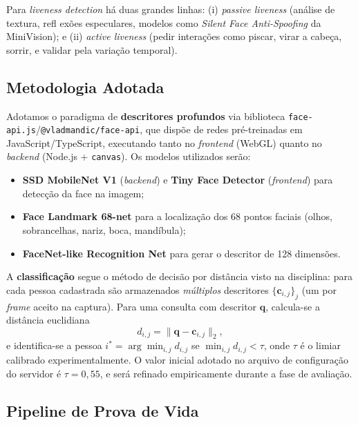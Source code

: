 \documentclass[12pt,a4paper]{article}
\begin{document}
Para \emph{liveness detection} h\'a duas grandes linhas: (i) \emph{passive liveness}
(an\'alise de textura, refl ex\~oes especulares, modelos como \emph{Silent Face
Anti-Spoofing} da MiniVision); e (ii) \emph{active liveness} (pedir intera\c{c}\~oes
como piscar, virar a cabe\c{c}a, sorrir, e validar pela varia\c{c}\~ao temporal).

\subsection{Metodologia Adotada}

Adotamos o paradigma de \textbf{descritores profundos} via biblioteca
\texttt{face-api.js}/\texttt{@vladmandic/face-api}, que disp\~oe de redes pr\'e-treinadas
em JavaScript/TypeScript, executando tanto no \emph{frontend} (WebGL) quanto no
\emph{backend} (Node.js + \texttt{canvas}). Os modelos utilizados ser\~ao:

\begin{itemize}[leftmargin=*]
    \item \textbf{SSD MobileNet V1} (\emph{backend}) e \textbf{Tiny Face Detector}
    (\emph{frontend}) para detec\c{c}\~ao da face na imagem;

    \item \textbf{Face Landmark 68-net} para a localiza\c{c}\~ao dos 68 pontos faciais
    (olhos, sobrancelhas, nariz, boca, mand\'ibula);

    \item \textbf{FaceNet-like Recognition Net} para gerar o descritor de 128 dimens\~oes.
\end{itemize}

A \textbf{classifica\c{c}\~ao} segue o m\'etodo de decis\~ao por dist\^ancia visto na disciplina:
para cada pessoa cadastrada s\~ao armazenados \emph{m\'ultiplos} descritores
$\{\mathbf{c}_{i,j}\}_j$ (um por \emph{frame} aceito na captura). Para uma consulta com
descritor $\mathbf{q}$, calcula-se a dist\^ancia euclidiana
\[
    d_{i,j} = \| \mathbf{q} - \mathbf{c}_{i,j} \|_2 ,
\]
e identifica-se a pessoa $i^{*} = \arg\min_{i,j} d_{i,j}$ se $\min_{i,j} d_{i,j} < \tau$,
onde $\tau$ \'e o limiar calibrado experimentalmente. O valor inicial adotado
no arquivo de configura\c{c}\~ao do servidor \'e $\tau = 0{,}55$, e ser\'a refinado
empiricamente durante a fase de avalia\c{c}\~ao.

\subsection{Pipeline de Prova de Vida}
\end{document}
